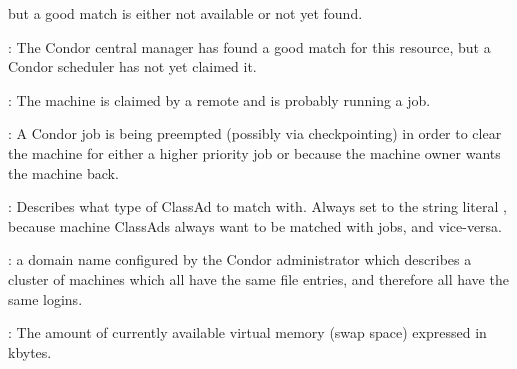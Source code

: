 \begin{description}
\begin{description}
but a good match is either not available or not 
yet found.
	\item[\AdStr{Matched}] : The Condor central manager has found a good
match for this resource, but a Condor scheduler has not yet claimed it.
	\item[\AdStr{Claimed}] : The machine is claimed by a remote
 and is probably running a job.
	\item[\AdStr{Preempting}] : A Condor job is being preempted (possibly
via checkpointing) in order to clear the machine for either a higher
priority job or because the machine owner wants the machine back.
	\end{description}   %
%
\item[\AdAttr{TargetType}] : Describes what type of ClassAd to match with.
Always set to the string literal , because machine ClassAds
always want to be matched with jobs, and vice-versa.
%
\item[\AdAttr{UidDomain}] : a domain name configured by the Condor 
administrator which describes a cluster of machines which all have 
the same  file entries, and therefore all have the same logins.
%
\item[\AdAttr{VirtualMemory}] : The amount of currently available virtual memory 
(swap space) expressed in kbytes.

\end{description}
